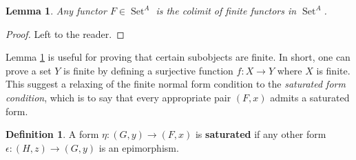 \documentclass[12pt]{article}
\theoremstyle{plain}
\newtheorem{lemma}[thm]{Lemma}
\theoremstyle{definition}
\newtheorem{defn}[thm]{Definition} %
\newcommand{\lto}{\longrightarrow}
\DeclareMathOperator{\set}{Set}
\begin{document}
  \begin{lemma}\label{lem:finite_generation_functors}
		Any functor $F \in \set^A$ is the colimit of finite functors in $\set^A$.
		\end{lemma}
	\begin{proof}
	    Left to the reader.
	\end{proof}

 Lemma \ref{lem:finite_generation_functors} is useful for proving that certain subobjects are finite. In short, one can prove a set $Y$ is finite by defining a surjective function $f: X \lto Y$ where $X$ is finite. This suggest a relaxing of the finite normal form condition to the \emph{saturated form condition}, which is to say that every appropriate pair $(F,x)$ admits a saturated form.

 \begin{defn}\label{def:saturated}
		A form $\eta: (G, y) \lto (F,x)$ is \textbf{saturated} if any other form $\epsilon: (H, z) \lto (G,y)$ is an epimorphism.
		\end{defn}
	
\end{document}
